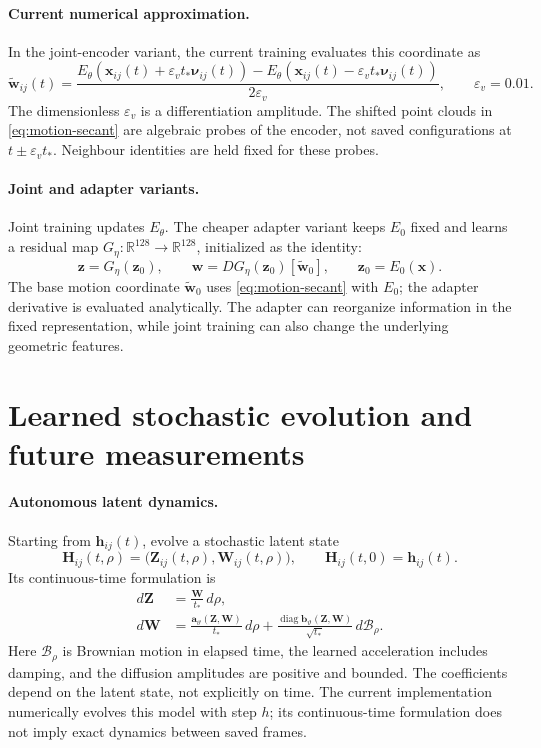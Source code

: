 \documentclass[11pt,a4paper]{article}
\newcommand{\R}{\mathbb R}
\newcommand{\x}{\mathbf x}
\newcommand{\z}{\mathbf z}
\begin{document}
\paragraph{Current numerical approximation.}
In the joint-encoder variant, the current training evaluates this coordinate as
\begin{equation}
\widetilde{\mathbf w}_{ij}(t)=
\frac{E_\theta(\x_{ij}(t)+\varepsilon_v t_*\boldsymbol\nu_{ij}(t))
      -E_\theta(\x_{ij}(t)-\varepsilon_v t_*\boldsymbol\nu_{ij}(t))}
     {2\varepsilon_v},
\qquad \varepsilon_v=0.01.
\label{eq:motion-secant}
\end{equation}
The dimensionless $\varepsilon_v$ is a differentiation amplitude.
The shifted point clouds in \eqref{eq:motion-secant} are algebraic probes of the
encoder, not saved configurations at $t\pm\varepsilon_v t_*$. Neighbour identities
are held fixed for these probes.

\paragraph{Joint and adapter variants.}
Joint training updates $E_\theta$. The cheaper adapter variant keeps $E_0$ fixed
and learns a residual map $G_\eta:\R^{128}\to\R^{128}$, initialized as the identity:
\[
\z=G_\eta(\z_0),\qquad
\mathbf w=D G_\eta(\z_0)[\widetilde{\mathbf w}_0],
\qquad \z_0=E_0(\x).
\]
The base motion coordinate $\widetilde{\mathbf w}_0$ uses
\eqref{eq:motion-secant} with $E_0$; the adapter derivative is evaluated
analytically. The adapter can reorganize information in the fixed representation,
while joint training can also change the underlying geometric features.

\section{Learned stochastic evolution and future measurements}

\paragraph{Autonomous latent dynamics.}
Starting from $\mathbf h_{ij}(t)$, evolve a stochastic latent state
\[
\mathbf H_{ij}(t,\rho)=
\bigl(\mathbf Z_{ij}(t,\rho),\mathbf W_{ij}(t,\rho)\bigr),
\qquad \mathbf H_{ij}(t,0)=\mathbf h_{ij}(t).
\]
Its continuous-time formulation is
\begin{equation}
\begin{aligned}
d\mathbf Z&=\frac{\mathbf W}{t_*}\,d\rho,\\
d\mathbf W&=\frac{\mathbf a_\vartheta(\mathbf Z,\mathbf W)}{t_*}\,d\rho
 +\frac{\operatorname{diag}\mathbf b_\vartheta(\mathbf Z,\mathbf W)}{\sqrt{t_*}}
 \,d\boldsymbol{\mathcal B}_\rho.
\end{aligned}
\label{eq:sde}
\end{equation}
Here $\boldsymbol{\mathcal B}_\rho$ is Brownian motion in elapsed time, the learned
acceleration includes damping, and the diffusion amplitudes are positive and
bounded. The coefficients depend on the latent state, not explicitly on time.
The current implementation numerically evolves this model with step $h$; its
continuous-time formulation does not imply exact dynamics between saved frames.
\end{document}
